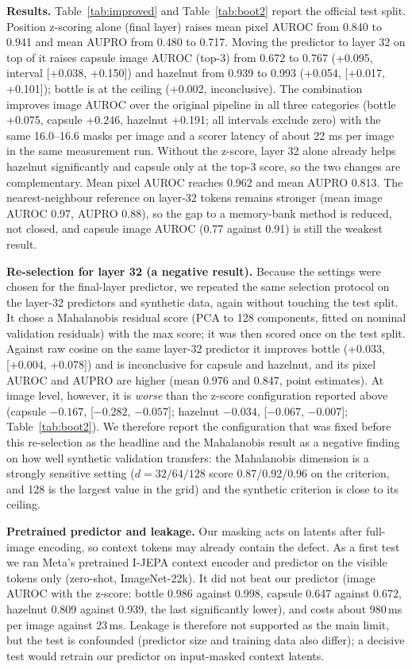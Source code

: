 \documentclass[conference]{IEEEtran}
\begin{document}
\textbf{Results.} Table~\ref{tab:improved} and Table~\ref{tab:boot2} report the official test split. Position z-scoring alone (final layer) raises mean pixel AUROC from 0.840 to 0.941 and mean AUPRO from 0.480 to 0.717. Moving the predictor to layer 32 on top of it raises capsule image AUROC (top-3) from 0.672 to 0.767 (+0.095, interval [+0.038, +0.150]) and hazelnut from 0.939 to 0.993 (+0.054, [+0.017, +0.101]); bottle is at the ceiling (+0.002, inconclusive). The combination improves image AUROC over the original pipeline in all three categories (bottle +0.075, capsule +0.246, hazelnut +0.191; all intervals exclude zero) with the same 16.0--16.6 masks per image and a scorer latency of about 22 ms per image in the same measurement run. Without the z-score, layer 32 alone already helps hazelnut significantly and capsule only at the top-3 score, so the two changes are complementary. Mean pixel AUROC reaches 0.962 and mean AUPRO 0.813. The nearest-neighbour reference on layer-32 tokens remains stronger (mean image AUROC 0.97, AUPRO 0.88), so the gap to a memory-bank method is reduced, not closed, and capsule image AUROC (0.77 against 0.91) is still the weakest result.




\textbf{Re-selection for layer 32 (a negative result).} Because the settings were chosen for the final-layer predictor, we repeated the same selection protocol on the layer-32 predictors and synthetic data, again without touching the test split. It chose a Mahalanobis residual score (PCA to 128 components, fitted on nominal validation residuals) with the max score; it was then scored once on the test split. Against raw cosine on the same layer-32 predictor it improves bottle (+0.033, [+0.004, +0.078]) and is inconclusive for capsule and hazelnut, and its pixel AUROC and AUPRO are higher (mean 0.976 and 0.847, point estimates). At image level, however, it is \emph{worse} than the z-score configuration reported above (capsule $-0.167$, [$-0.282$, $-0.057$]; hazelnut $-0.034$, [$-0.067$, $-0.007$]; Table~\ref{tab:boot2}). We therefore report the configuration that was fixed before this re-selection as the headline and the Mahalanobis result as a negative finding on how well synthetic validation transfers: the Mahalanobis dimension is a strongly sensitive setting ($d{=}32/64/128$ score 0.87/0.92/0.96 on the criterion, and 128 is the largest value in the grid) and the synthetic criterion is close to its ceiling.

\textbf{Pretrained predictor and leakage.} Our masking acts on latents after full-image encoding, so context tokens may already contain the defect. As a first test we ran Meta's pretrained I-JEPA context encoder and predictor on the visible tokens only (zero-shot, ImageNet-22k). It did not beat our predictor (image AUROC with the z-score: bottle 0.986 against 0.998, capsule 0.647 against 0.672, hazelnut 0.809 against 0.939, the last significantly lower), and costs about 980\,ms per image against 23\,ms. Leakage is therefore not supported as the main limit, but the test is confounded (predictor size and training data also differ); a decisive test would retrain our predictor on input-masked context latents.
\end{document}
